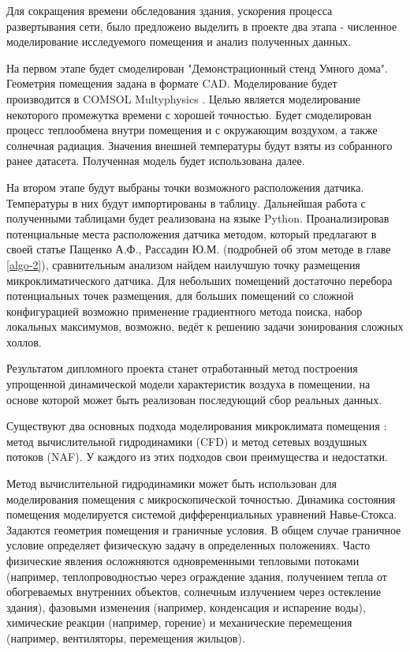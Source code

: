 Для сокращения времени обследования здания, ускорения процесса развертывания сети, было предложено выделить в проекте два этапа - численное моделирование исследуемого помещения и анализ полученных данных.

На первом этапе будет смоделирован "Демонстрационный стенд Умного дома". Геометрия помещения задана в формате CAD. Моделирование будет производится в COMSOL Multyphysics \cite{comsol}. Целью является моделирование некоторого промежутка времени с хорошей точностью. Будет смоделирован процесс теплообмена внутри помещения и с окружающим воздухом, а также солнечная радиация. Значения внешней температуры будут взяты из собранного ранее датасета. Полученная модель будет использована далее.

На втором этапе будут выбраны точки возможного расположения датчика. Температуры в них будут импортированы в таблицу. Дальнейшая работа с полученными таблицами будет реализована на языке Python. Проанализировав потенциальные места расположения датчика методом, который предлагают в своей статье Пащенко А.Ф., Рассадин Ю.М. \cite{indent} (подробней об этом методе в главе \ref{algo-2}), сравнительным анализом найдем наилучшую точку размещения микроклиматического датчика. Для небольших помещений достаточно перебора потенциальных точек размещения, для больших помещений со сложной конфигурацией возможно применение градиентного метода поиска, набор локальных максимумов, возможно, ведёт к решению задачи зонирования сложных холлов.

\newpage

Результатом дипломного проекта станет отработанный метод построения упрощенной динамической модели характеристик воздуха в помещении, на основе которой может быть реализован последующий сбор реальных данных.

\newpage


Существуют два основных подхода моделирования микроклимата помещения \cite{ashrae}: метод вычислительной гидродинамики (CFD) и метод сетевых воздушных потоков (NAF). У каждого из этих подходов свои преимущества и недостатки.

Метод вычислительной гидродинамики \cite{cfd} может быть использован для моделирования помещения с микроскопической точностью. Динамика состояния помещения моделируется системой дифференциальных уравнений Навье-Стокса. Задаются геометрия помещения и граничные условия. В общем случае граничное условие определяет физическую задачу в определенных положениях. Часто физические явления осложняются одновременными тепловыми потоками (например, теплопроводностью через ограждение здания, получением тепла от обогреваемых внутренних объектов, солнечным излучением через остекление здания), фазовыми изменения (например, конденсация и испарение воды), химические реакции (например, горение) и механические перемещения (например, вентиляторы, перемещения жильцов).

